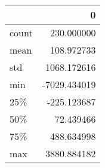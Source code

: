 \begin{tabular}{lr}
\toprule
{} &            0 \\
\midrule
count &   230.000000 \\
mean  &   108.972733 \\
std   &  1068.172616 \\
min   & -7029.434019 \\
25\%   &  -225.123687 \\
50\%   &    72.439466 \\
75\%   &   488.634998 \\
max   &  3880.884182 \\
\bottomrule
\end{tabular}
